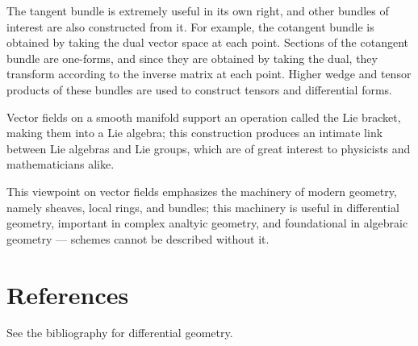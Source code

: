 \documentclass{article}
\theoremstyle{remark}
\begin{document}
The tangent bundle is extremely useful in its own right, and other bundles of interest are also constructed from it.  For example, the cotangent bundle is obtained by taking the dual vector space at each point.  Sections of the cotangent bundle are one-forms, and since they are obtained by taking the dual, they transform according to the inverse matrix at each point.  Higher wedge and tensor products of these bundles are used to construct tensors and differential forms.

Vector fields on a smooth manifold support an operation called the Lie bracket, making them into a Lie algebra; this construction produces an intimate link between Lie algebras and Lie groups, which are of great interest to physicists and mathematicians alike.

This viewpoint on vector fields emphasizes the machinery of modern geometry, namely sheaves, local rings, and bundles; this machinery is useful in differential geometry, important in complex analtyic geometry, and foundational in algebraic geometry --- schemes cannot be described without it.

\section*{References}

See the bibliography for differential geometry.
\end{document}
